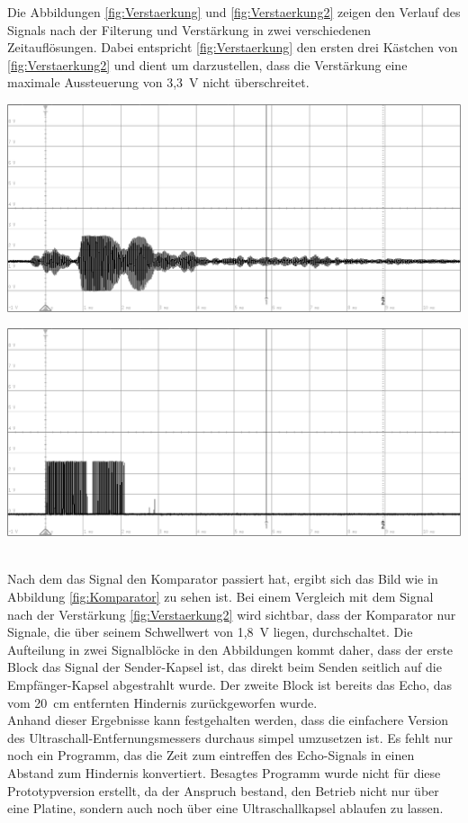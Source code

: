 Die Abbildungen \ref{fig:Verstaerkung} und \ref{fig:Verstaerkung2} zeigen den Verlauf des Signals nach der Filterung und Verstärkung in zwei verschiedenen Zeitauflösungen. Dabei entspricht \ref{fig:Verstaerkung} den ersten drei Kästchen von \ref{fig:Verstaerkung2} und dient um darzustellen, dass die Verstärkung eine maximale Aussteuerung von 3,3~V nicht überschreitet.\\
\begin{minipage}{0.5\textwidth}
\includegraphics[width=1\textwidth%
]{Abbildungen/MessungenP1/Signal-nach-Verstarkung2.png}
\label{fig:Verstaerkung2}
\end{minipage}
\begin{minipage}{0.5\textwidth}
\includegraphics[width=1\textwidth%
]{Abbildungen/MessungenP1/Signal-nach-Komparator.png}
\label{fig:Komparator}
\end{minipage}\\
Nach dem das Signal den Komparator passiert hat, ergibt sich das Bild wie in Abbildung \ref{fig:Komparator} zu sehen ist. Bei einem Vergleich mit dem Signal nach der Verstärkung \ref{fig:Verstaerkung2} wird sichtbar, dass der Komparator nur Signale, die über seinem Schwellwert von 1,8~V liegen, durchschaltet. Die Aufteilung in zwei Signalblöcke in den Abbildungen kommt daher, dass der erste Block das Signal der Sender-Kapsel ist, das direkt beim Senden seitlich auf die Empfänger-Kapsel abgestrahlt wurde. Der zweite Block ist bereits das Echo, das vom 20~cm entfernten Hindernis zurückgeworfen wurde.\\
Anhand dieser Ergebnisse kann festgehalten werden, dass die einfachere Version des Ultraschall-Entfernungsmessers durchaus simpel umzusetzen ist. Es fehlt nur noch ein Programm, das die Zeit zum eintreffen des Echo-Signals in einen Abstand zum Hindernis konvertiert. Besagtes Programm wurde nicht für diese Prototypversion erstellt, da der Anspruch bestand, den Betrieb nicht nur über eine Platine, sondern auch noch über eine Ultraschallkapsel ablaufen zu lassen.
\newpage
